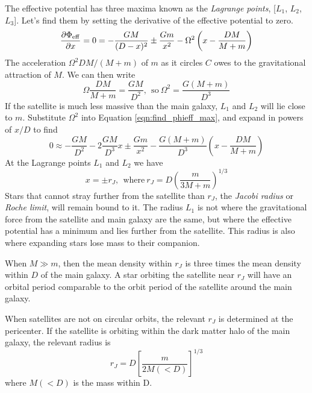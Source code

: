 \documentclass[]{article}
\begin{document}
The effective potential has three maxima known as the {\it Lagrange points}, [$L_1$, $L_2$, $L_3$].  Let's find them by setting
the derivative of the effective potential to zero.
\begin{equation}
\label{eqn:find_phieff_max}
\frac{\partial\Phi_\mathrm{eff}}{\partial x} = 0 = -\frac{GM}{(D-x)^2} \pm \frac{Gm}{x^2} - \Omega^2\left(x-\frac{DM}{M+m}\right)
\end{equation}
\noindent
The acceleration $\Omega^2DM/(M+m)$ of $m$ as it circles $C$ owes to the gravitational
attraction of $M$. We can then write
\begin{equation}
\Omega\frac{DM}{M+m}=\frac{GM}{D^2},~~\mathrm{so}~\Omega^2=\frac{G(M+m)}{D^3}
\end{equation}
\noindent
If the satellite is much less massive than the main galaxy, $L_1$ and $L_2$ will lie close to $m$.
Substitute $\Omega^2$ into Equation \ref{eqn:find_phieff_max}, and expand in powers of $x/D$ to find
\begin{equation}
0 \approx -\frac{GM}{D^2} - 2\frac{GM}{D^3}x \pm \frac{Gm}{x^2} - \frac{G(M+m)}{D^3}\left(x-\frac{DM}{M+m}\right)
\end{equation}
\noindent
At the Lagrange points $L_1$ and $L_2$ we have
\begin{equation}
x = \pm r_J, ~~\mathrm{where}~r_J = D\left(\frac{m}{3M+m}\right)^{1/3}
\end{equation}
\noindent
Stars that cannot stray further from the satellite than $r_J$, the {\it Jacobi radius} or {\it Roche limit},
will remain bound to it.  The radius $L_1$ is not where the gravitational force from the satellite and 
main galaxy are the same, but where the effective potential has a minimum and lies further from the satellite.
This radius is also where expanding stars lose mass to their companion.

When $M\gg m$, then the mean density within $r_J$ is three times the mean density within $D$ of the main galaxy.
A star orbiting the satellite near $r_J$ will have an orbital period comparable to the orbit period of the
satellite around the main galaxy.

When satellites are not on circular orbits, the relevant $r_J$ is determined at the pericenter. If the
satellite is orbiting within the dark matter halo of the main galaxy, the relevant radius is
\begin{equation}
r_J = D\left[\frac{m}{2M(<D)}\right]^{1/3}
\end{equation}
where $M(<D)$ is the mass within D.
\end{document}
